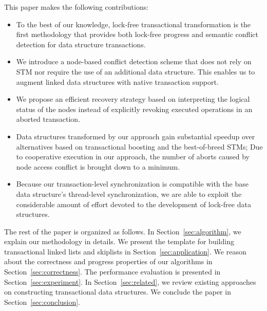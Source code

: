 \documentclass{sig-alternate-05-2015}
\begin{document}
This paper makes the following contributions:
\begin{itemize}
    \item To the best of our knowledge, lock-free transactional transformation is the first methodology that provides both lock-free progress and semantic conflict detection for data structure transactions. 
    \item We introduce a node-based conflict detection scheme that does not rely on STM nor require the use of an additional data structure. This enables us to augment linked data structures with native transaction support.
    \item We propose an efficient recovery strategy based on interpreting the logical status of the nodes instead of explicitly revoking executed operations in an aborted transaction.
    \item Data structures transformed by our approach gain substantial speedup over alternatives based on transactional boosting and the best-of-breed STMs; Due to cooperative execution in our approach, the number of aborts caused by node access conflict is brought down to a minimum.
    \item Because our transaction-level synchronization is compatible with the base data structure's thread-level synchronization, we are able to exploit the considerable amount of effort devoted to the development of lock-free data structures.
\end{itemize}

The rest of the paper is organized as follows. 
In Section~\ref{sec:algorithm}, we explain our methodology in details.
We present the template for building transactional linked lists and skiplists in Section~\ref{sec:application}.
We reason about the correctness and progress properties of our algorithms in Section~\ref{sec:correctness}.
The performance evaluation is presented in Section~\ref{sec:experiment}.
In Section~\ref{sec:related}, we review existing approaches on constructing transactional data structures.
We conclude the paper in Section~\ref{sec:conclusion}.
\end{document}
